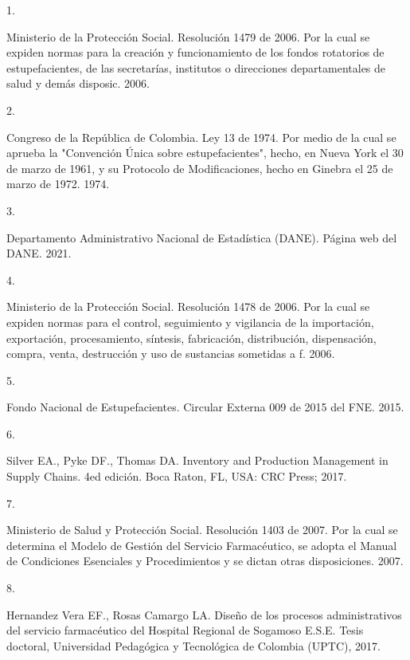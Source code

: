 \documentclass[
]{book}
\newlength{\cslhangindent}
\newlength{\csllabelwidth}
\newlength{\cslentryspacingunit} %
\newenvironment{CSLReferences}[2] %
 {%
  \setlength{\parindent}{0pt}
  \ifodd #1
  \let\oldpar\par
  \def\par{\hangindent=\cslhangindent\oldpar}
  \fi
  \setlength{\parskip}{#2\cslentryspacingunit}
 }%
 {}
\newcommand{\CSLLeftMargin}[1]{\parbox[t]{\csllabelwidth}{#1}}
\newcommand{\CSLRightInline}[1]{\parbox[t]{\linewidth - \csllabelwidth}{#1}\break}
\begin{document}
\hypertarget{refs}{}
\begin{CSLReferences}{0}{0}
\leavevmode{}%
\CSLLeftMargin{1. }
\CSLRightInline{Ministerio de la Protección Social. {Resoluci{ó}n 1479 de 2006. Por la cual se expiden normas para la creaci{ó}n y funcionamiento de los fondos rotatorios de estupefacientes, de las secretar{í}as, institutos o direcciones departamentales de salud y dem{á}s disposic}. 2006.}

\leavevmode{}%
\CSLLeftMargin{2. }
\CSLRightInline{Congreso de la República de Colombia. {Ley 13 de 1974. Por medio de la cual se aprueba la "Convenci{ó}n {Ú}nica sobre estupefacientes", hecho, en Nueva York el 30 de marzo de 1961, y su Protocolo de Modificaciones, hecho en Ginebra el 25 de marzo de 1972}. 1974.}

\leavevmode{}%
\CSLLeftMargin{3. }
\CSLRightInline{Departamento Administrativo Nacional de Estadística (DANE). {P{á}gina web del DANE}. 2021.}

\leavevmode{}%
\CSLLeftMargin{4. }
\CSLRightInline{Ministerio de la Protección Social. {Resoluci{ó}n 1478 de 2006. Por la cual se expiden normas para el control, seguimiento y vigilancia de la importaci{ó}n, exportaci{ó}n, procesamiento, s{í}ntesis, fabricaci{ó}n, distribuci{ó}n, dispensaci{ó}n, compra, venta, destrucci{ó}n y uso de sustancias sometidas a f}. 2006.}

\leavevmode{}%
\CSLLeftMargin{5. }
\CSLRightInline{Fondo Nacional de Estupefacientes. {Circular Externa 009 de 2015 del FNE}. 2015.}

\leavevmode{}%
\CSLLeftMargin{6. }
\CSLRightInline{Silver EA., Pyke DF., Thomas DA. {Inventory and Production Management in Supply Chains}. 4ed edición. Boca Raton, FL, USA: CRC Press; 2017.}

\leavevmode{}%
\CSLLeftMargin{7. }
\CSLRightInline{Ministerio de Salud y Protección Social. {Resoluci{ó}n 1403 de 2007. Por la cual se determina el Modelo de Gesti{ó}n del Servicio Farmac{é}utico, se adopta el Manual de Condiciones Esenciales y Procedimientos y se dictan otras disposiciones}. 2007.}

\leavevmode{}%
\CSLLeftMargin{8. }
\CSLRightInline{Hernandez Vera EF., Rosas Camargo LA. {Dise{ñ}o de los procesos administrativos del servicio farmac{é}utico del Hospital Regional de Sogamoso E.S.E.} Tesis doctoral, Universidad Pedag{ó}gica y Tecnol{ó}gica de Colombia (UPTC), 2017.}

\end{CSLReferences}
\end{document}
